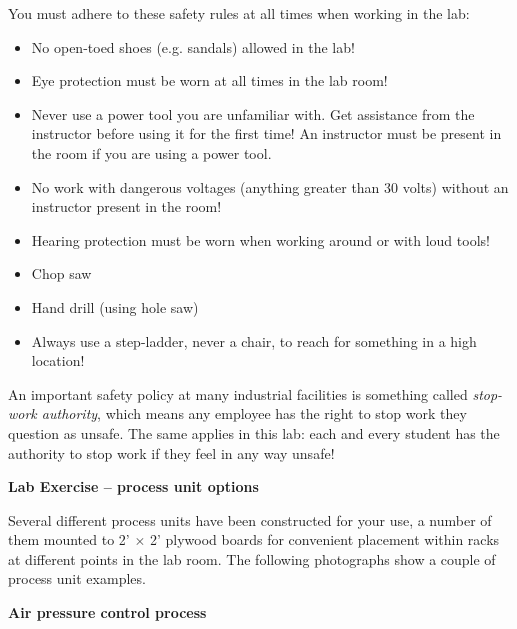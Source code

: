 \vskip 30pt

\noindent
You must adhere to these safety rules at all times when working in the lab:

\begin{itemize}
\item{} No open-toed shoes (e.g. sandals) allowed in the lab!
\vskip 10pt
\item{} Eye protection must be worn at all times in the lab room!
\vskip 10pt
\item{} Never use a power tool you are unfamiliar with.  Get assistance from the instructor before using it for the first time!  An instructor must be present in the room if you are using a power tool.
\vskip 10pt
\item{} No work with dangerous voltages (anything greater than 30 volts) without an instructor present in the room!
\vskip 10pt
\item{} Hearing protection must be worn when working around or with loud tools!
\item{} Chop saw
\item{} Hand drill (using hole saw)
\vskip 10pt
\item{} Always use a step-ladder, never a chair, to reach for something in a high location!
\end{itemize}

\vskip 20pt

An important safety policy at many industrial facilities is something called {\it stop-work authority}, which means any employee has the right to stop work they question as unsafe.  The same applies in this lab: each and every student has the authority to stop work if they feel in any way unsafe!








\vfil \eject

\noindent
{\bf Lab Exercise -- process unit options}

\vskip 5pt

Several different process units have been constructed for your use, a number of them mounted to 2' $\times$ 2' plywood boards for convenient placement within racks at different points in the lab room.  The following photographs show a couple of process unit examples.

\vskip 10pt

\noindent
{\bf Air pressure control process}

